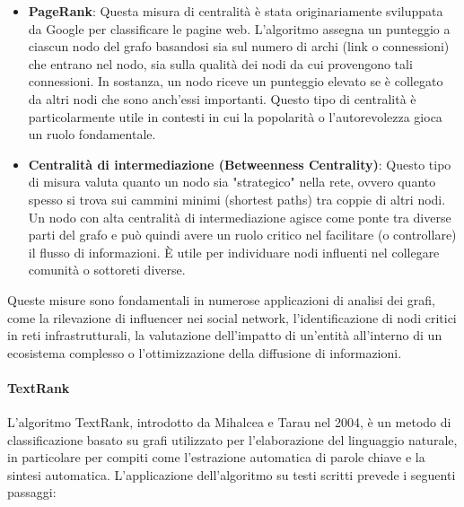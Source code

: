\begin{itemize}
  \item \textbf{PageRank}: Questa misura di centralità è stata originariamente sviluppata da Google per classificare le pagine web. L'algoritmo assegna un punteggio a ciascun nodo del grafo basandosi sia sul numero di archi (link o connessioni) che entrano nel nodo, sia sulla qualità dei nodi da cui provengono tali connessioni. In sostanza, un nodo riceve un punteggio elevato se è collegato da altri nodi che sono anch'essi importanti. Questo tipo di centralità è particolarmente utile in contesti in cui la popolarità o l’autorevolezza gioca un ruolo fondamentale.

  \item \textbf{Centralità di intermediazione (Betweenness Centrality)}: Questo tipo di misura valuta quanto un nodo sia "strategico" nella rete, ovvero quanto spesso si trova sui cammini minimi (shortest paths) tra coppie di altri nodi. Un nodo con alta centralità di intermediazione agisce come ponte tra diverse parti del grafo e può quindi avere un ruolo critico nel facilitare (o controllare) il flusso di informazioni. È utile per individuare nodi influenti nel collegare comunità o sottoreti diverse.
\end{itemize}

Queste misure sono fondamentali in numerose applicazioni di analisi dei grafi, come la rilevazione di influencer nei social network, l’identificazione di nodi critici in reti infrastrutturali, la valutazione dell’impatto di un'entità all’interno di un ecosistema complesso o l’ottimizzazione della diffusione di informazioni.

\paragraph{TextRank} L'algoritmo TextRank, introdotto da Mihalcea e Tarau nel 2004, è un metodo di classificazione basato su grafi utilizzato per l'elaborazione del linguaggio naturale, in particolare per compiti come l'estrazione automatica di parole chiave e la sintesi automatica. L'applicazione dell'algoritmo su testi scritti prevede i seguenti passaggi:

